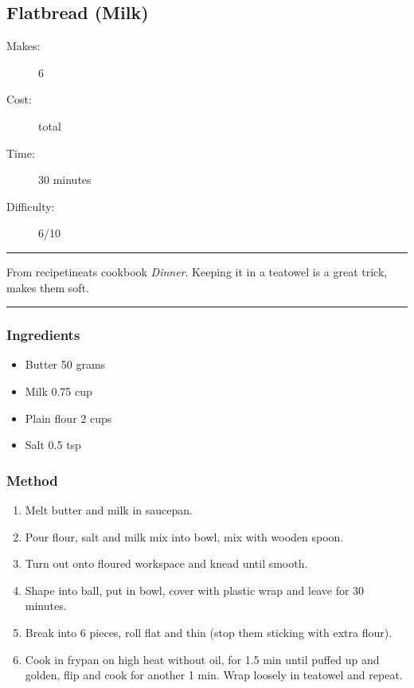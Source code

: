 \documentclass[]{article}
\begin{document}
\subsection*{\center\huge Flatbread (Milk)}
\begin{description}
\item[Makes:] 6 
\item[Cost:]  total
\item[Time:] 30 minutes
\item[Difficulty:] 6/10
\end{description}
\vspace{0.2cm}\hrule\vspace{0.5cm}
\begin{adjustwidth}{0.5 cm}{0.5 cm}

From recipetineats cookbook \textit{Dinner}. Keeping it in a teatowel is a great trick, makes them soft. \hfill{}\color{black}

\end{adjustwidth}
\vspace{0.5cm}\hrule
\subsubsection*{\Large Ingredients}
\begin{multicols}{2}
\begin{itemize}
 \item Butter \hfill 50 grams
 \item Milk \hfill 0.75 cup
 \item Plain flour \hfill 2 cups
 \item Salt \hfill 0.5 tsp
\end{itemize}
\end{multicols}
\subsubsection*{\Large Method}
\begin{enumerate}[font=\huge\color{accent}]
	\item Melt butter and milk in saucepan.
	\item Pour flour, salt and milk mix into bowl, mix with wooden spoon.
	\item Turn out onto floured workspace and knead until smooth.
	\item Shape into ball, put in bowl, cover with plastic wrap and leave for 30 minutes.
	\item Break into 6 pieces, roll flat and thin (stop them sticking with extra flour).
	\item Cook in frypan on high heat without oil, for 1.5 min until puffed up and golden, flip and cook for another 1 min. Wrap loosely in teatowel and repeat.
\end{enumerate}
\newpage
{}\label{rec:Flatbread (Yoghurt)}
\end{document}
